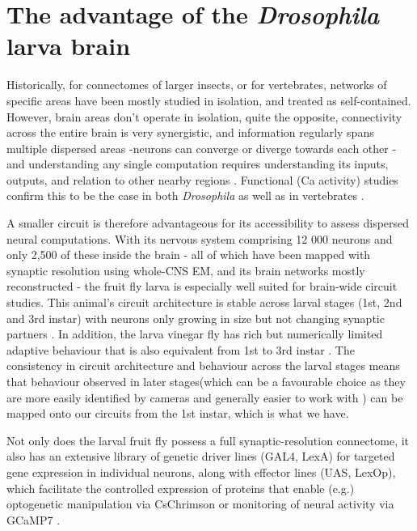 \section{The advantage of the \textit{Drosophila} larva brain}
Historically, for connectomes of larger insects, or for vertebrates, networks of specific areas have been mostly studied in isolation, and treated as self-contained. However, brain areas don’t operate in isolation, quite the opposite, connectivity across the entire brain is very synergistic, and information regularly spans multiple dispersed areas -neurons can converge or diverge towards each other - and understanding any single computation requires understanding its inputs, outputs, and relation to other nearby regions \citep{huang2020bricseq}. Functional (Ca activity) studies confirm this to be the case in both \textit{Drosophila} \citep{lemon2015whole} as well as in vertebrates \citep{ahrens2013whole}. 

A smaller circuit is therefore advantageous for its accessibility to assess dispersed neural computations. With its nervous system comprising 12 000 neurons and only 2,500  of these inside the brain - all of which have been mapped with synaptic resolution using whole-CNS EM, and its brain networks mostly reconstructed \citep{winding2023connectome} - the fruit fly larva is especially well suited for brain-wide circuit studies. This animal’s circuit architecture is stable across larval stages (1st, 2nd and 3rd instar) with neurons only growing in size but not changing synaptic partners \citep{gerhard2017conserved}. In addition, the larva vinegar fly has rich but numerically limited adaptive behaviour that is also equivalent from 1st to 3rd instar \citep{almeida2017ol1mpiad}. The consistency in circuit architecture and behaviour across the larval stages means that behaviour observed in later stages(which can be a favourable choice as they are more easily identified by cameras and generally easier to work with ) can be mapped onto our circuits from the 1st instar, which is what we have. 


Not only does the larval fruit fly possess a full synaptic-resolution connectome, it also has an extensive library of genetic driver lines (GAL4, LexA) for targeted gene expression in individual neurons, along with effector lines (UAS, LexOp), which facilitate the controlled expression of proteins that enable (e.g.) optogenetic manipulation via CsChrimson \citep{kim2015optogenetics} or monitoring of neural activity via GCaMP7 \citep{owald2015light}.

